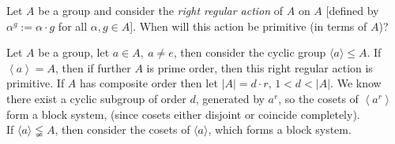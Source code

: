 \documentclass{article}
\begin{document}
\begin{homeworkProblem}
    Let $A$ be a group and consider the \textit{right regular action} of $A$
    on $A$ [defined by $\alpha^g := \alpha \cdot g$ for all $\alpha, g \in A$].
    When will this action be primitive 
    (in terms of $A$)?\\
    \solution

    Let $A$ be a group, let $a\in A, \ a \neq e$, then 
    consider the cyclic group $\langle a \rangle \leq A$.
    If $\left\langle a \right\rangle = A$, then
    if further $A$ is prime order, then this right regular action is primitive.
    If $A$ has composite order then let $\lvert A \rvert = d \cdot r$,
    $1 < d < \lvert A \rvert$. We know there exist a cyclic subgroup of order $d$, 
    generated by $a^r$, so the cosets of $\left\langle a^r \right\rangle $ form a block system,
    (since cosets either disjoint or coincide completely).\\
    If $\langle a \rangle \lneqq A$,
    then consider the cosets of $\langle a \rangle$, which forms a block system.
    
\end{homeworkProblem}

\pagebreak
\end{document}
